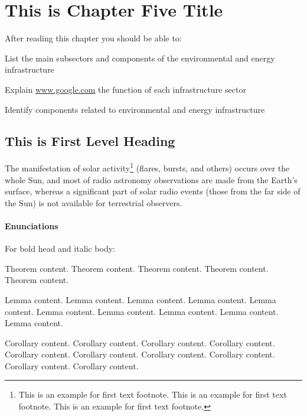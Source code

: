 \chapter{This is Chapter Five Title}

After reading this chapter you should be able to:

\begin{objectives}
\item List the main subsectors and components of the environmental and energy infrastructure

\item Explain \url{www.google.com} the function of each infrastructure sector

\item Identify components related to environmental and energy infrastructure
\end{objectives}

\section{This is First Level Heading}

\lipsum[1-2]

The manifestation of solar activity\footnote{This is an example for first text footnote. This is an example for first text footnote. This is an example for first text footnote.} (flares, bursts, and others) occurs over the whole Sun, and most of radio astronomy observations are made from the Earth's surface, whereas a significant part of solar radio events (those from the far side of the Sun) is not available for terrestrial observers.

\subsubsection*{Enunciations}
 
For bold head and italic body:

\begin{theorem}
Theorem content. Theorem content. Theorem content. Theorem content. Theorem content. 
\end{theorem}

\begin{lemma}
Lemma content. Lemma content. Lemma content. Lemma content. Lemma content. Lemma content. 
Lemma content. 
Lemma content. 
Lemma content. 
Lemma content. 
\end{lemma}

\begin{corollary}
Corollary content. Corollary content. Corollary content. Corollary content. Corollary content. Corollary content. 
Corollary content. 
Corollary content. 
Corollary content. 
Corollary content. 
\end{corollary}

